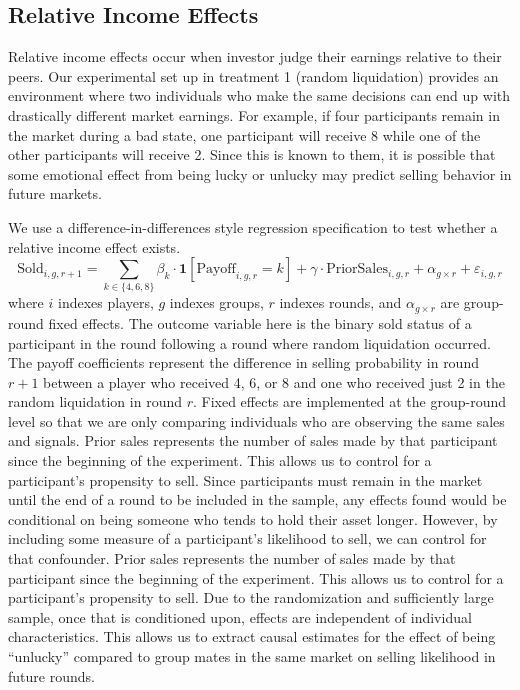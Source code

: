 \documentclass[11pt]{article}
\begin{document}


\subsection{Relative Income Effects}

Relative income effects occur when investor judge their earnings relative to their peers. Our experimental set up in treatment 1 (random liquidation) provides an environment where two individuals who make the same decisions can end up with drastically different market earnings. For example, if four participants remain in the market during a bad state, one participant will receive 8 while one of the other participants will receive 2. Since this is known to them, it is possible that some emotional effect from being lucky or unlucky may predict selling behavior in future markets. 

We use a difference-in-differences style regression specification to test whether a relative income effect exists.
\begin{equation}
\text{Sold}_{i,g,r+1} = \sum_{k \in \{4,6,8\}} \beta_k \cdot \mathbf{1}[\text{Payoff}_{i,g,r} = k] + \gamma \cdot \text{PriorSales}_{i,g,r} + \alpha_{g \times r} + \varepsilon_{i,g,r}
\end{equation}
where $i$ indexes players, $g$ indexes groups, $r$ indexes rounds, and $\alpha_{g\times r}$ are group-round fixed effects. The outcome variable here is the binary sold status of a participant in the round following a round where random liquidation occurred. The payoff coefficients represent the difference in selling probability in round $r+1$ between a player who received 4, 6, or 8 and one who received just 2 in the random liquidation in round $r$. Fixed effects are implemented at the group-round level so that we are only comparing individuals who are observing the same sales and signals. Prior sales represents the number of sales made by that participant since the beginning of the experiment. This allows us to control for a participant's propensity to sell.  Since participants must remain in the market until the end of a round to be included in the sample, any effects found would be conditional on being someone who tends to hold their asset longer. However, by including some measure of a participant's likelihood to sell, we can control for that confounder. Prior sales represents the number of sales made by that participant since the beginning of the experiment. This allows us to control for a participant's propensity to sell. Due to the randomization and sufficiently large sample, once that is conditioned upon, effects are independent of individual characteristics. This allows us to extract causal estimates for the effect of being ``unlucky'' compared to group mates in the same market on selling likelihood in future rounds. 
\end{document}
